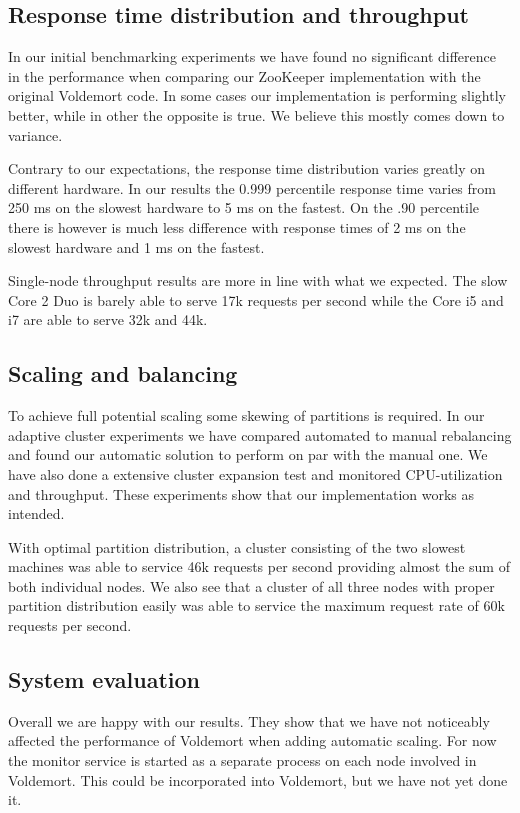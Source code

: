 \subsection{Response time distribution and throughput}
\label{eval:responsetime}
In our initial benchmarking experiments we have found no significant difference in the performance when comparing our ZooKeeper implementation with the original Voldemort code. In some cases our implementation is performing slightly better, while in other the opposite is true. We believe this mostly comes down to variance.

Contrary to our expectations, the response time distribution varies greatly on different hardware. In our results the 0.999 percentile response time varies from 250 ms on the slowest hardware to 5 ms on the fastest. On the .90 percentile there is however is much less difference with response times of 2 ms on the slowest hardware and 1 ms on the fastest.

Single-node throughput results are more in line with what we expected. The slow Core 2 Duo is barely able to serve 17k requests per second while the Core i5 and i7 are able to serve 32k and 44k. 

\subsection{Scaling and balancing}
\label{eval:balance}
To achieve full potential scaling some skewing of partitions is required. In our adaptive cluster experiments we have compared automated to manual rebalancing and found our automatic solution to perform on par with the manual one. We have also done a extensive cluster expansion test and monitored CPU-utilization and throughput. These experiments show that our implementation works as intended. 

With optimal partition distribution, a cluster consisting of the two slowest machines was able to service 46k requests per second providing almost the sum of both individual nodes. We also see that a cluster of all three nodes with proper partition distribution easily was able to service the maximum request rate of 60k requests per second. 

\subsection{System evaluation}
\label{eval:discussion}
Overall we are happy with our results. They show that we have not noticeably affected the performance of Voldemort when adding automatic scaling. For now the monitor service is started as a separate process on each node involved in Voldemort. This could be incorporated into Voldemort, but we have not yet done it.  

